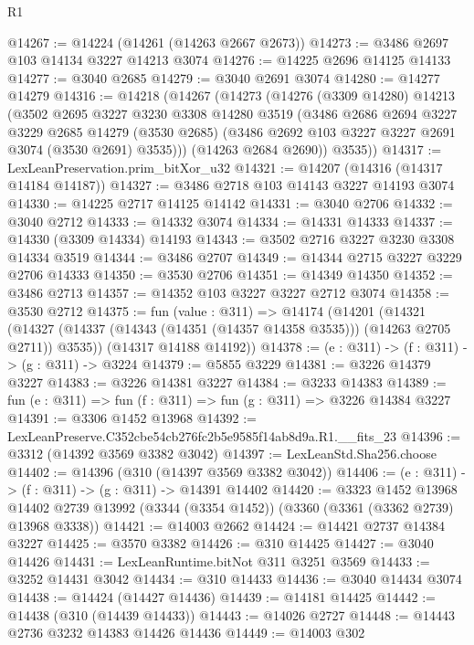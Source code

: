 \begin{lexlean}{R1}
\begin{coremodule}
@14267 := @14224 (@14261 (@14263 @2667 @2673))
@14273 := @3486 @2697 @103 @14134 @3227 @14213 @3074
@14276 := @14225 @2696 @14125 @14133
@14277 := @3040 @2685
@14279 := @3040 @2691 @3074
@14280 := @14277 @14279
@14316 := @14218
    (@14267
      (@14273
        (@14276
          (@3309 @14280)
          @14213
          (@3502
            @2695
            @3227
            @3230
            @3308
            @14280
            @3519
            (@3486
              @2686
              @2694
              @3227
              @3229
              @2685
              @14279
              (@3530 @2685)
              (@3486 @2692 @103 @3227 @3227 @2691 @3074 (@3530 @2691) @3535)))
          (@14263 @2684 @2690))
        @3535))
@14317 := LexLeanPreservation.prim_bitXor_u32
@14321 := @14207 (@14316 (@14317 @14184 @14187))
@14327 := @3486 @2718 @103 @14143 @3227 @14193 @3074
@14330 := @14225 @2717 @14125 @14142
@14331 := @3040 @2706
@14332 := @3040 @2712
@14333 := @14332 @3074
@14334 := @14331 @14333
@14337 := @14330 (@3309 @14334) @14193
@14343 := @3502 @2716 @3227 @3230 @3308 @14334 @3519
@14344 := @3486 @2707
@14349 := @14344 @2715 @3227 @3229 @2706 @14333
@14350 := @3530 @2706
@14351 := @14349 @14350
@14352 := @3486 @2713
@14357 := @14352 @103 @3227 @3227 @2712 @3074
@14358 := @3530 @2712
@14375 := fun (value : @311) =>
  @14174
    (@14201
      (@14321 (@14327 (@14337 (@14343 (@14351 (@14357 @14358 @3535))) (@14263 @2705 @2711)) @3535))
      (@14317 @14188 @14192))
@14378 := (e : @311) -> (f : @311) -> (g : @311) -> @3224
@14379 := @5855 @3229
@14381 := @3226 @14379 @3227
@14383 := @3226 @14381 @3227
@14384 := @3233 @14383
@14389 := fun (e : @311) => fun (f : @311) => fun (g : @311) => @3226 @14384 @3227
@14391 := @3306 @1452 @13968
@14392 := LexLeanPreserve.C352cbe54cb276fc2b5e9585f14ab8d9a.R1.__fits_23
@14396 := @3312 (@14392 @3569 @3382 @3042)
@14397 := LexLeanStd.Sha256.choose
@14402 := @14396 (@310 (@14397 @3569 @3382 @3042))
@14406 := (e : @311) -> (f : @311) -> (g : @311) -> @14391 @14402
@14420 := @3323
    @1452
    @13968
    @14402
    @2739
    @13992
    (@3344 (@3354 @1452))
    (@3360 (@3361 (@3362 @2739) @13968 @3338))
@14421 := @14003 @2662
@14424 := @14421 @2737 @14384 @3227
@14425 := @3570 @3382
@14426 := @310 @14425
@14427 := @3040 @14426
@14431 := LexLeanRuntime.bitNot @311 @3251 @3569
@14433 := @3252 @14431 @3042
@14434 := @310 @14433
@14436 := @3040 @14434 @3074
@14438 := @14424 (@14427 @14436)
@14439 := @14181 @14425
@14442 := @14438 (@310 (@14439 @14433))
@14443 := @14026 @2727
@14448 := @14443 @2736 @3232 @14383 @14426 @14436
@14449 := @14003 @302

\end{coremodule}
\end{lexlean}
